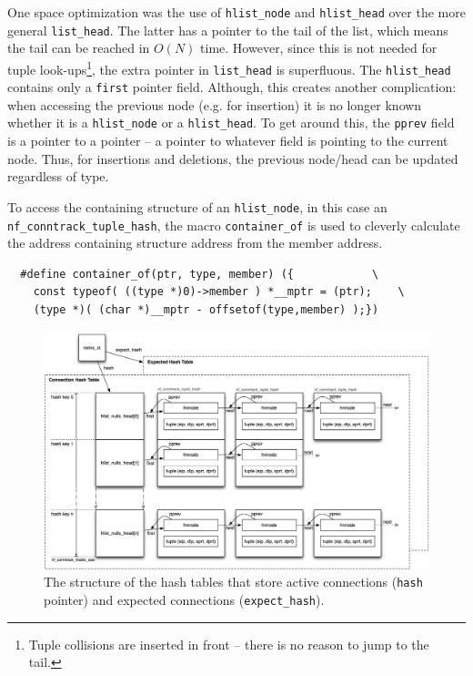 \documentclass[a4paper,10pt]{article}
\newcommand{\code}[1]{\texttt{{#1}}}
\begin{document}
One space optimization was the use of
\verb|hlist_node| and \verb|hlist_head| over the more general \verb|list_head|. The
latter has a pointer to the tail of the list, which means the tail can
be reached in $O(N)$ time. However, since this is not needed for tuple
look-ups\footnote{Tuple collisions are inserted in front -- there is
  no reason to jump to the tail.}, the extra pointer in
\verb|list_head| is superfluous. The \verb|hlist_head| contains only a
\verb|first| pointer field. Although, this creates another
complication: when accessing the previous node (e.g. for insertion) it
is no longer known whether it is a \verb|hlist_node| or a
\verb|hlist_head|. To get around this, the \verb|pprev| field is
a pointer to a pointer -- a pointer to whatever field is pointing to
the current node. Thus, for insertions and deletions, the previous node/head can be
updated regardless of type.

To access the containing structure of an \verb|hlist_node|, in this
case an \verb|nf_conntrack_tuple_hash|, the macro
\verb|container_of| is used to cleverly calculate
the address containing structure address from the member address.

\begin{lstlisting}
  #define container_of(ptr, type, member) ({			\
	const typeof( ((type *)0)->member ) *__mptr = (ptr);	\
	(type *)( (char *)__mptr - offsetof(type,member) );})
\end{lstlisting}


\begin{figure}
  \centering
  \includegraphics[totalheight=0.60\textheight]{images/hash_expect_tables.png}
  \caption{The structure of the hash tables that store active
    connections (\code{hash} pointer) and expected connections
    (\code{expect\_hash}).}\label{fig:hash}
\end{figure}
\end{document}
